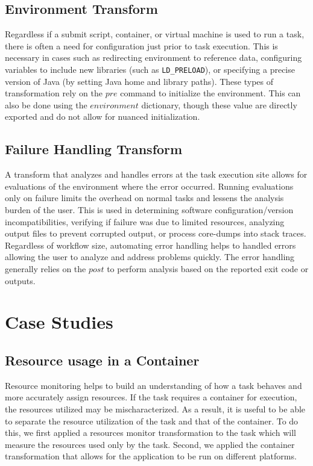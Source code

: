 \documentclass[conference]{IEEEtran}
\begin{document}
\subsection{Environment Transform}

Regardless if a submit script, 
container, or virtual machine 
is used to run a task, 
there is often a need for configuration 
just prior to task execution. 
This is necessary in cases such as
redirecting environment to reference data,
configuring variables to include new libraries
(such as {\tt LD\_PRELOAD}),
or specifying a precise version of Java
(by setting Java home and library paths).
These types of transformation rely on the 
${pre}$ command to initialize the environment. 
This can also be done using
the ${environment}$ dictionary, though these
value are directly exported and do not 
allow for nuanced initialization.

\subsection{Failure Handling Transform}

A transform that analyzes and handles errors at the task execution site
allows for evaluations of the environment where the error occurred.
Running evaluations only on failure limits the overhead 
on normal tasks and lessens the analysis burden of the user.
This is used in 
determining software configuration/version incompatibilities, 
verifying if failure was due to limited resources, 
analyzing output files to prevent corrupted output,
or process core-dumps into stack traces. 
Regardless of workflow size,
automating error handling helps to handled errors
allowing the user to analyze and address problems quickly. 
The error handling generally relies on the $post$ to 
perform analysis based on the reported
exit code or outputs.

\section{Case Studies}


\subsection{Resource usage in a Container}
Resource monitoring helps to build an understanding of how
a task behaves and more accurately assign resources. 
If the task requires a container for execution, the 
resources utilized may be mischaracterized. 
As a result, it is useful to be able to separate the
resource utilization of the task and that of the container.
To do this, we first applied a 
resources monitor transformation to the task
which will measure the resources used only
by the task.
Second, we applied the container transformation
that allows for the application to be run on 
different platforms.
\end{document}
